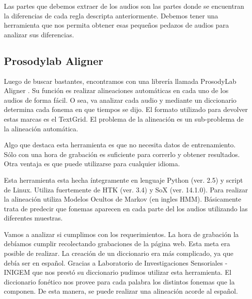\documentclass[11pt,a4paper,twoside]{tesis}
\begin{document}
Las partes que debemos extraer de los audios son las partes donde se encuentran la diferencias de cada regla descripta anteriormente. Debemos tener una herramienta que nos permita obtener esas pequeños pedazos de audios para analizar sus diferencias. 

\subsection{Prosodylab Aligner}


Luego de buscar bastantes, encontramos con una librería llamada ProsodyLab Aligner \cite{prosodylab}. Su función es realizar alineaciones automáticas en cada uno de los audios de forma fácil. O sea, va analizar cada audio y mediante un diccionario determina cada fonema en que tiempos se dijo. El formato utilizado para devolver estas marcas es el TextGrid. El problema de la alineación es un sub-problema de la alineación automática.

Algo que destaca esta herramienta es que no necesita datos de entrenamiento. Sólo con una hora de grabación es suficiente para correrlo y obtener resultados. Otra ventaja es que puede utilizarse para cualquier idioma. 

Esta herramienta esta hecha íntegramente en lenguaje Python (ver. 2.5) y script de Linux. Utiliza fuertemente de HTK (ver. 3.4) y SoX (ver. 14.1.0). Para realizar la alineación utiliza Modelos Ocultos de Markov \cite{rabiner} (en ingles HMM). Básicamente trata de predecir que fonemas aparecen en cada parte del los audios utilizando las diferentes muestras.


Vamos a analizar si cumplimos con los requerimientos. La hora de grabación la debíamos cumplir recolectando grabaciones de la página web. Esta meta era posible de realizar. La creación de un diccionario era más complicado, ya que debía ser en español. Gracias a Laboratorio de Investigaciones Sensoriales - INIGEM que nos prestó su diccionario pudimos utilizar esta herramienta. El diccionario fonético nos provee para cada palabra los distintos fonemas que la componen. De esta manera, se puede realizar una alineación acorde al español.
\end{document}
